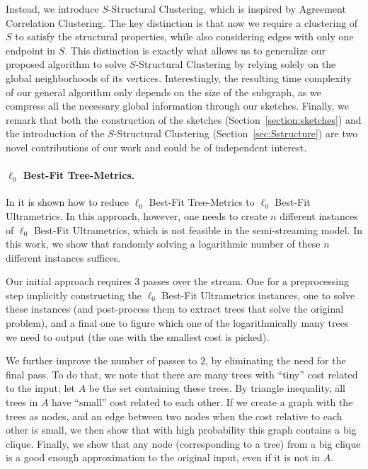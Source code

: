 \documentclass{article}
\begin{document}
Instead, we introduce $S$-Structural Clustering, which is inspired by Agreement Correlation Clustering. The key distinction is that now we require a clustering of $S$ to satisfy the structural properties, while also considering edges with only one endpoint in $S$.
This distinction is exactly what allows us to generalize our proposed algorithm to solve $S$-Structural Clustering by relying solely on the global neighborhoods of its vertices. 
Interestingly, the resulting time complexity of our general algorithm only depends on the size of the subgraph, as we compress all the necessary global information through our sketches.
Finally, we remark that both the construction of the sketches (Section~\ref{section:sketches}) and the introduction of the \( S \)-Structural Clustering (Section~\ref{sec:Sstructure}) are two novel contributions of our work and could be of independent interest. 


\paragraph*{$\ell_0$ Best-Fit Tree-Metrics.}
In \cite{kipouridis2023fitting} it is shown how to reduce $\ell_0$ Best-Fit Tree-Metrics to $\ell_0$ Best-Fit Ultrametrics.
In this approach, however, one needs to create $n$ different instances of $\ell_0$ Best-Fit Ultrametrics, which is not feasible in the semi-streaming model.
In this work, we show that randomly solving a logarithmic number of these $n$ different instances suffices.

Our initial approach requires $3$ passes over the stream. One for a preprocessing step implicitly constructing the $\ell_0$ Best-Fit Ultrametrics instances, one to solve these instances (and post-process them to extract trees that solve the original problem), and a final one to figure which one of the logarithmically many trees we need to output (the one with the smallest cost is picked).

We further improve the number of passes to $2$, by eliminating the need for the final pass.
To do that, we note that there are many trees with ``tiny'' cost related to the input; let $A$ be the set containing these trees.
By triangle inequality, all trees in $A$ have ``small'' cost related to each other.
If we create a graph with the trees as nodes, and an edge between two nodes when the cost relative to each other is small, we then show that with high probability this graph contains a big clique.
Finally, we show that any node (corresponding to a tree) from a big clique is a good enough approximation to the original input, even if it is not in $A$.
\end{document}
